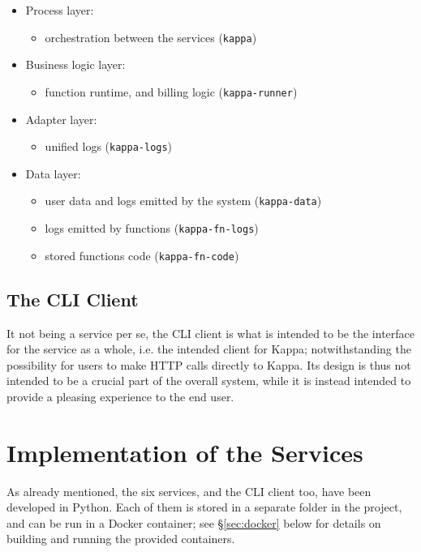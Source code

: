 \documentclass[a4paper]{ifacconf}
\begin{document}
    \begin{itemize}
        \item Process layer: 
        \begin{itemize}
            \item orchestration between the services (\texttt{kappa})
        \end{itemize}
        \item Business logic layer:
        \begin{itemize}
            \item function runtime, and billing logic (\texttt{kappa-runner})
        \end{itemize}
        \item Adapter layer:
        \begin{itemize}
            \item unified logs (\texttt{kappa-logs})
        \end{itemize}
        \item Data layer:
        \begin{itemize}
            \item user data and logs emitted by the system (\texttt{kappa-data})
            \item logs emitted by functions (\texttt{kappa-fn-logs})
            \item stored functions code (\texttt{kappa-fn-code})
        \end{itemize}
    \end{itemize}
    
    \subsection{The CLI Client}
    
    It not being a service per se, the CLI client is what is intended to be the interface for the service as a whole, i.e. the intended client for Kappa; notwithstanding the possibility for users to make HTTP calls directly to Kappa.
    Its design is thus not intended to be a crucial part of the overall system, while it is instead intended to provide a pleasing experience to the end user.
    
    \section{Implementation of the Services}\label{sec:implementation}
    
    As already mentioned, the six services, and the CLI client too, have been developed in Python.
    Each of them is stored in a separate folder in the project, and can be run in a Docker container; see \S\ref{sec:docker} below for details on building and running the provided containers.
    
\end{document}
